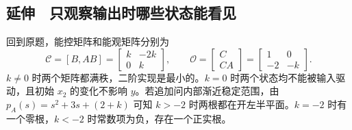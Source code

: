 \subsection{延伸　只观察输出时哪些状态能看见}

回到原题，能控矩阵和能观矩阵分别为
\[
 \mathcal C=[B,AB]=\begin{bmatrix}k&-2k\\0&k\end{bmatrix},\qquad
 \mathcal O=\begin{bmatrix}C\\CA\end{bmatrix}=\begin{bmatrix}1&0\\-2&-k\end{bmatrix}.
\]
$k\ne0$ 时两个矩阵都满秩，二阶实现是最小的。$k=0$ 时两个状态均不能被输入驱动，且初始 $x_2$ 的变化不影响 $y$。若追加问内部渐近稳定范围，由
$p_A(s)=s^2+3s+(2+k)$ 可知 $k>-2$ 时两根都在开左半平面。$k=-2$ 时有一个零根，$k<-2$ 时常数项为负，存在一个正实根。
